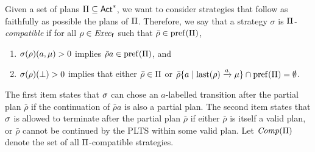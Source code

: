 



Given a set of plans $\Pi\subseteq{\rm \sf Act}^*$, we want to consider
strategies that follow as faithfully as possible the plans of
$\Pi$.  Therefore, we say that a strategy $\sigma$ is
\emph{$\Pi$-compatible} if for all $\rho\in\mathit{Exec}_{\mathsf{f}}$ such that
$\bar{\rho}\in\mathrm{pref}(\Pi)$,
%
\begin{enumerate}
\item%
  $\sigma(\rho)(a,\mu)>0$ implies $\bar{\rho}a\in\mathrm{pref}(\Pi)$, and
\item%
  $\sigma(\rho)(\bot)>0$ implies that either
  $\bar{\rho}\in\Pi$ or
  $\bar{\rho}\{a\mid{\mathrm{last}(\rho)\xrightarrow{a}\mu}\}\cap\mathrm{pref}(\Pi) = \emptyset$. 
\end{enumerate}
%
The first item states that $\sigma$ can chose an $a$-labelled
transition after the partial plan $\bar{\rho}$ if the continuation of
$\bar{\rho}a$ is also a partial plan.
%
The second item states that $\sigma$ is allowed to terminate after the
partial plan $\bar{\rho}$ if either $\bar{\rho}$ is itself a valid
plan, or $\bar{\rho}$ cannot be continued by the PLTS within some
valid plan.
%
Let $\mathit{Comp}(\Pi)$ denote the set of all $\Pi$-compatible
strategies.
%


